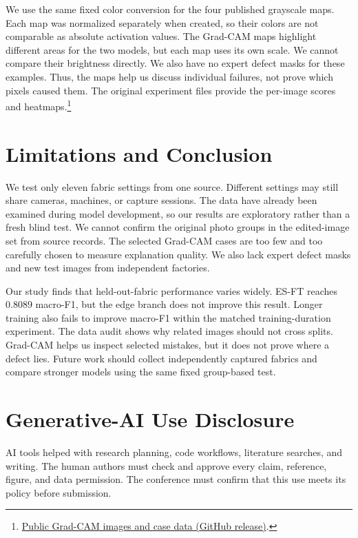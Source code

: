 \documentclass[conference,a4paper]{IEEEtran}
\begin{document}
We use the same fixed color conversion for the four published grayscale maps. Each map was normalized separately when created, so their colors are not comparable as absolute activation values. The Grad-CAM maps highlight different areas for the two models, but each map uses its own scale. We cannot compare their brightness directly. We also have no expert defect masks for these examples. Thus, the maps help us discuss individual failures, not prove which pixels caused them. The original experiment files provide the per-image scores and heatmaps.\footnote{\href{https://github.com/kahakashanashraf/Broken-Stitch-Detection-in-Garment-Manufacturing/releases/tag/thesis-only-vs-fabric-heldout-gradcam-v1}{Public Grad-CAM images and case data (GitHub release)}.}

\section{Limitations and Conclusion}
We test only eleven fabric settings from one source. Different settings may still share cameras, machines, or capture sessions. The data have already been examined during model development, so our results are exploratory rather than a fresh blind test. We cannot confirm the original photo groups in the edited-image set from source records. The selected Grad-CAM cases are too few and too carefully chosen to measure explanation quality. We also lack expert defect masks and new test images from independent factories.

Our study finds that held-out-fabric performance varies widely. ES-FT reaches 0.8089 macro-F1, but the edge branch does not improve this result. Longer training also fails to improve macro-F1 within the matched training-duration experiment. The data audit shows why related images should not cross splits. Grad-CAM helps us inspect selected mistakes, but it does not prove where a defect lies. Future work should collect independently captured fabrics and compare stronger models using the same fixed group-based test.

\section*{Generative-AI Use Disclosure}
AI tools helped with research planning, code workflows, literature searches, and writing. The human authors must check and approve every claim, reference, figure, and data permission. The conference must confirm that this use meets its policy before submission.
\end{document}

